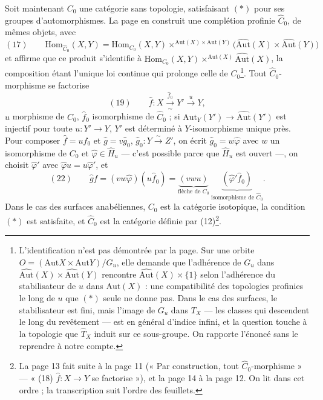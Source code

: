 \documentclass[11pt,a4paper]{article}
\begin{document}
Soit maintenant $C_0$ une catégorie sans topologie, satisfaisant $(*)$ pour
ses groupes d'automorphismes. La page en construit une complétion profinie $\widehat{C}_0$, de mêmes objets, avec
\[
(17)\qquad \mathrm{Hom}_{\widehat{C}_0}(X, Y) = \mathrm{Hom}_{C_0}(X, Y) \times^{\mathrm{Aut}(X) \times \mathrm{Aut}(Y)} \bigl(\widehat{\mathrm{Aut}}(X) \times \widehat{\mathrm{Aut}}(Y)\bigr)
\]
et affirme que ce produit s'identifie à
$\mathrm{Hom}_{C_0}(X, Y) \times^{\mathrm{Aut}(X)} \widehat{\mathrm{Aut}}(X)$,
la composition étant l'unique loi continue qui prolonge celle de
$C_0$\footnote{L'identification n'est pas démontrée par la page. Sur une orbite
$O = (\mathrm{Aut} X \times \mathrm{Aut} Y)/G_u$, elle demande que l'adhérence
de $G_u$ dans $\widehat{\mathrm{Aut}}(X) \times \widehat{\mathrm{Aut}}(Y)$
rencontre $\widehat{\mathrm{Aut}}(X) \times \{1\}$ selon l'adhérence du
stabilisateur de $u$ dans $\mathrm{Aut}(X)$ : une compatibilité des topologies
profinies le long de $u$ que $(*)$ seule ne donne pas. Dans le cas des
surfaces, le stabilisateur est fini, mais l'image de $G_u$ dans $T_X$ — les
classes qui descendent le long du revêtement — est en général d'indice infini,
et la question touche à la topologie que $\widehat{T}_X$ induit sur ce
sous-groupe. On rapporte l'énoncé sans le reprendre à notre compte.}. Tout
$\widehat{C}_0$-morphisme se factorise
\[
(19)\qquad \hat f : X \xrightarrow[\ \sim\ ]{\ \hat f_0\ } Y' \xrightarrow{\ u\ } Y ,
\]
$u$ morphisme de $C_0$, $\hat f_0$ isomorphisme de $\widehat{C}_0$ ; si
$\mathrm{Aut}_Y(Y') \to \widehat{\mathrm{Aut}}(Y')$ est injectif pour toute
$u : Y' \to Y$, $Y'$ est déterminé à $Y$-isomorphisme unique près. Pour
composer $\hat f = u \hat f_0$ et $\hat g = v \hat g_0$, $\hat g_0 : Y
\xrightarrow{\sim} Z'$, on écrit $\hat g_0 = w \hat\varphi$ avec $w$ un
isomorphisme de $C_0$ et $\hat\varphi \in \widehat{H}_u$ — c'est possible
parce que $\widehat{H}_u$ est ouvert —, on choisit $\hat\varphi'$ avec
$\hat\varphi u = u \hat\varphi'$, et
\[
(22)\qquad \hat g \hat f = (v w \hat\varphi)(u \hat f_0) = \underbrace{(v w u)}_{\text{flèche de } C_0}\ \underbrace{(\hat\varphi' \hat f_0)}_{\text{isomorphisme de } \widehat{C}_0} .
\]
Dans le cas des surfaces anabéliennes, $C_0$ est la catégorie isotopique, la
condition $(*)$ est satisfaite, et $\widehat{C}_0$ est la catégorie définie par
(12)\footnote{La page 13 fait suite à la page 11 (« Par construction, tout
$\widehat{C}_0$-morphisme » — « (18) $\hat f : X \to Y$ se factorise »), et la
page 14 à la page 12. On lit dans cet ordre ; la transcription suit l'ordre des
feuillets.}.
\end{document}
